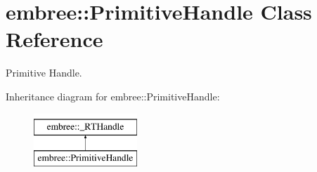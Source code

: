 \hypertarget{classembree_1_1_primitive_handle}{
\section{embree::PrimitiveHandle Class Reference}
\label{classembree_1_1_primitive_handle}
}


Primitive Handle.  


Inheritance diagram for embree::PrimitiveHandle:\begin{figure}[H]
\begin{center}
\leavevmode
\includegraphics[height=2.000000cm]{classembree_1_1_primitive_handle}
\end{center}
\end{figure}
